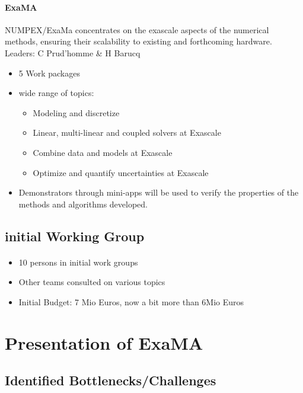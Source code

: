 \begin{frame}{\insertsectionhead}
  \framesubtitle{ExaMA}
  NUMPEX/ExaMa concentrates on the exascale aspects of the numerical methods, ensuring their scalability to existing and forthcoming hardware.
  \vfill
  Leaders: C Prud'homme \& H Barucq
  \begin{itemize}
    \item 5 Work packages
    \item wide range of topics: 
    \begin{itemize}
        \item Modeling and discretize
        \item Linear, multi-linear and coupled solvers at Exascale
        \item Combine data and  models at Exascale
        \item Optimize and quantify uncertainties at Exascale
    \end{itemize}
    \item Demonstrators through mini-apps will be used to verify the properties of the methods and algorithms developed.
  \end{itemize}
\end{frame}
\subsection{initial Working Group}
\begin{frame}{\insertsectionhead} 
  \framesubtitle{\insertsubsectionhead}
   \begin{itemize}
    \item 10 persons in initial work groups
    \item Other teams consulted on various topics 
    \item Initial Budget: 7 Mio Euros, now a bit more than 6Mio Euros
\end{itemize} 
\end{frame}

\section{Presentation of ExaMA}

\subsection{Identified Bottlenecks/Challenges}

